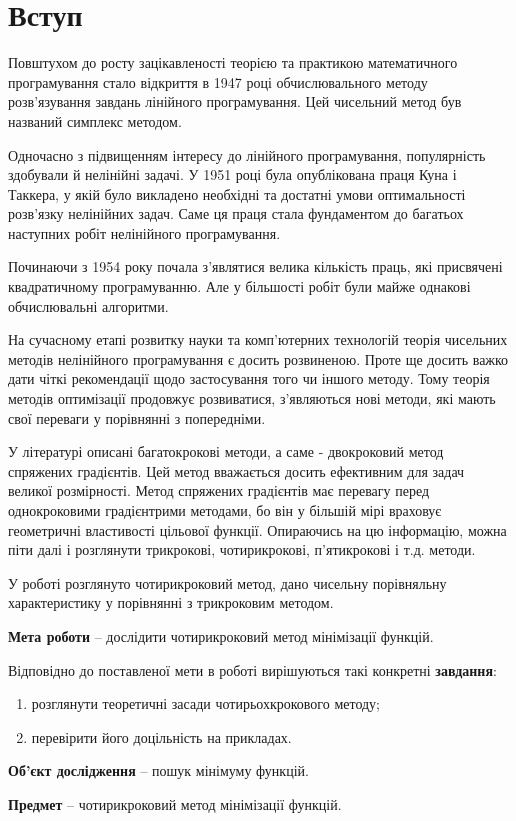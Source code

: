 \chapter*{Вступ}

Повштухом до росту зацікавленості теорією та практикою математичного програмування стало відкриття в 1947 році обчислювального методу розв'язування завдань лінійного програмування. Цей чисельний метод був названий симплекс методом.

Одночасно з підвищенням інтересу до лінійного програмування, популярність здобували й нелінійні задачі. У 1951 році була опублікована праця Куна і Таккера, у якій було викладено необхідні та достатні умови оптимальності розв'язку нелінійних задач. Саме ця праця стала фундаментом до багатьох наступних робіт нелінійного програмування. 

Починаючи з 1954 року почала з'являтися велика кількість праць, які присвячені квадратичному програмуванню. Але у більшості робіт були майже однакові обчислювальні алгоритми.

На сучасному етапі розвитку науки та комп'ютерних технологій теорія чисельних методів нелінійного програмування є досить розвиненою. Проте ще досить важко дати чіткі рекомендації щодо застосування того чи іншого методу. Тому теорія методів оптимізації продовжує розвиватися, з'являються нові методи, які мають свої переваги у порівнянні з попередніми.

У літературі описані багатокрокові методи, а саме - двокроковий метод спряжених градієнтів. Цей метод вважається досить ефективним для задач великої розмірності. Метод спряжених градієнтів має перевагу перед однокроковими градієнтрими методами, бо він у більшій мірі враховує геометричні властивості цільової функції. Опираючись на цю інформацію, можна піти далі і розглянути трикрокові, чотирикрокові, п'ятикрокові і т.д. методи.

У роботі розглянуто чотирикроковий метод, дано чисельну порівняльну характеристику у порівнянні з трикроковим методом.

\newpage
\textbf{Мета роботи} – дослідити чотирикроковий метод мінімізації функцій.

Відповідно до поставленої мети в роботі вирішуються такі конкретні \textbf{завдання}:
\begin{enumerate}
	\item розглянути теоретичні засади чотирьохкрокового методу;
	\item перевірити його доцільність на прикладах.
\end{enumerate}  

\textbf{Об'єкт дослідження} – пошук мінімуму функцій.

\textbf{Предмет} – чотирикроковий метод мінімізації функцій.
